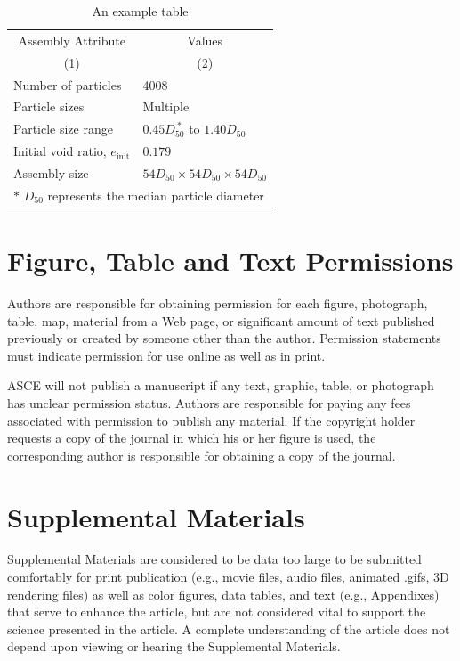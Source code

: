 \documentclass[Journal,letterpaper,NoLineNumbers]{ascelike-new}
\begin{document}
\begin{table}
\caption{An example table}
\label{table:assembly}
\centering
\small
\renewcommand{\arraystretch}{1.25}
\begin{tabular}{l l}
\hline\hline
\multicolumn{1}{c}{Assembly Attribute} &
\multicolumn{1}{c}{Values} \\
\multicolumn{1}{c}{(1)} &
\multicolumn{1}{c}{(2)} \\
\hline
Number of particles & 4008 \\
Particle sizes & Multiple  \\
Particle size range & $0.45D_{50}^{\:\ast}$ to $1.40D_{50}$ \\
Initial void ratio, $e_{\mathrm{init}}$ & $0.179$ \\
Assembly size & $54D_{50} \times 54D_{50} \times 54D_{50}$ \\
\hline
\multicolumn{2}{l}{$\ast$ $D_{50}$ represents the median particle diameter} \\
\hline\hline
\end{tabular}
\normalsize
\end{table}

\section{Figure, Table and Text Permissions}

Authors are responsible for obtaining permission for each figure, photograph, table, map, material from a Web page, or significant amount of text published previously or created by someone other than the author. Permission statements must indicate permission for use online as well as in print.

ASCE will not publish a manuscript if any text, graphic, table, or photograph has unclear permission status. Authors are responsible for paying any fees associated with permission to publish any material. If the copyright holder requests a copy of the journal in which his or her figure is used, the corresponding author is responsible for obtaining a copy of the journal.

\section{Supplemental Materials}

Supplemental Materials are considered to be data too large to be submitted comfortably for print publication (e.g., movie files, audio files, animated .gifs, 3D rendering files) as well as color figures, data tables, and text (e.g., Appendixes) that serve to enhance the article, but are not considered vital to support the science presented in the article. A complete understanding of the article does not depend upon viewing or hearing the Supplemental Materials.
\end{document}
